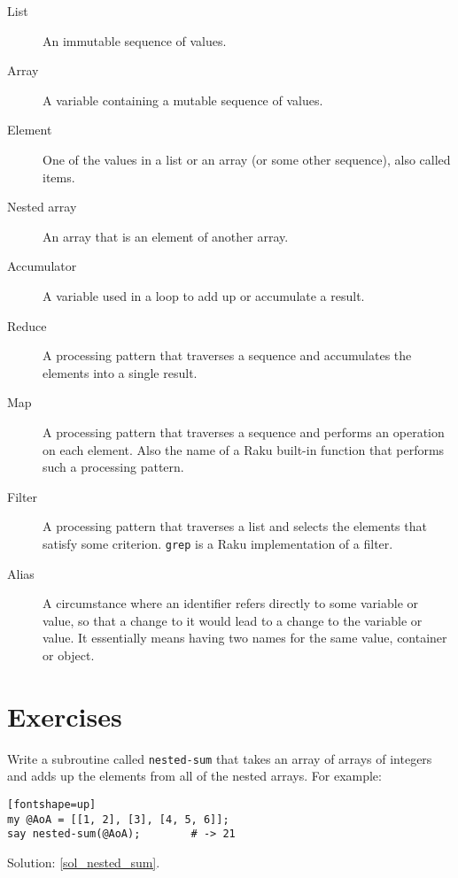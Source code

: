 \begin{description}

\item[List] An immutable sequence of values.

\item[Array] A variable containing a mutable sequence 
of values.

\item[Element] One of the values in a list or an 
array (or some other sequence), also called items.

\item[Nested array] An array that is an element of another array.

\item[Accumulator] A variable used in a loop to add up or
accumulate a result.

\item[Reduce] A processing pattern that traverses a sequence 
and accumulates the elements into a single result.

\item[Map] A processing pattern that traverses a 
sequence and performs an operation on each element. 
Also the name of a Raku built-in function that performs 
such a processing pattern.

\item[Filter] A processing pattern that traverses a 
list and selects the elements that satisfy some criterion. 
{\tt grep} is a Raku implementation of a filter.

\item[Alias] A circumstance where an identifier refers 
directly to some variable or value, so that 
a change to it would lead to a change to 
the variable or value. It essentially means having 
two names for the same value, container or object.

\end{description}


\section{Exercises}
\label{array_exercises}

\begin{exercise}

Write a subroutine called \verb"nested-sum" that takes an 
array of arrays of integers and adds up the elements from all of the nested arrays. For example:
\label{nested_sum}

\begin{verbatim}[fontshape=up]
my @AoA = [[1, 2], [3], [4, 5, 6]];
say nested-sum(@AoA);        # -> 21
\end{verbatim}

Solution: \ref{sol_nested_sum}.

\end{exercise}

